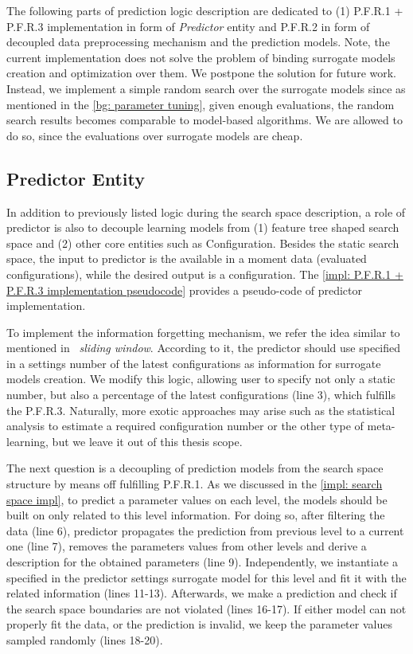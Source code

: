 The following parts of prediction logic description are dedicated to (1) P.F.R.1 + P.F.R.3 implementation in form of \emph{Predictor} entity and P.F.R.2 in form of decoupled data preprocessing mechanism and the prediction models. Note, the current implementation does not solve the problem of binding surrogate models creation and optimization over them. We postpone the solution for future work. Instead, we implement a simple random search over the surrogate models since as mentioned in the \cref{bg: parameter tuning}, given enough evaluations, the random search results becomes comparable to model-based algorithms. We are allowed to do so, since the evaluations over surrogate models are cheap.

\subsection{Predictor Entity}
In addition to previously listed logic during the search space description, a role of predictor is also to decouple learning models from (1) feature tree shaped search space and (2) other core entities such as Configuration. Besides the static search space, the input to predictor is the available in a moment data (evaluated configurations), while the desired output is a configuration. The \cref{impl: P.F.R.1 + P.F.R.3 implementation pseudocode} provides a pseudo-code of predictor implementation.

To implement the information forgetting mechanism, we refer the idea similar to mentioned in~\cite{ferreira2017multi} \emph{sliding window}. According to it, the predictor should use specified in a settings number of the latest configurations as information for surrogate models creation. We modify this logic, allowing user to specify not only a static number, but also a percentage of the latest configurations (line 3), which fulfills the P.F.R.3. Naturally, more exotic approaches may arise such as the statistical analysis to estimate a required configuration number or the other type of meta-learning, but we leave it out of this thesis scope.

The next question is a decoupling of prediction models from the search space structure by means off fulfilling P.F.R.1. As we discussed in the \cref{impl: search space impl}, to predict a parameter values on each level, the models should be built on only related to this level information. For doing so, after filtering the data (line 6), predictor propagates the prediction from previous level to a current one (line 7), removes the parameters values from other levels and derive a description for the obtained parameters (line 9). Independently, we instantiate a specified in the predictor settings surrogate model for this level and fit it with the related information (lines 11-13). Afterwards, we make a prediction and check if the search space boundaries are not violated (lines 16-17). If either model can not properly fit the data, or the prediction is invalid, we keep the parameter values sampled randomly (lines 18-20).

